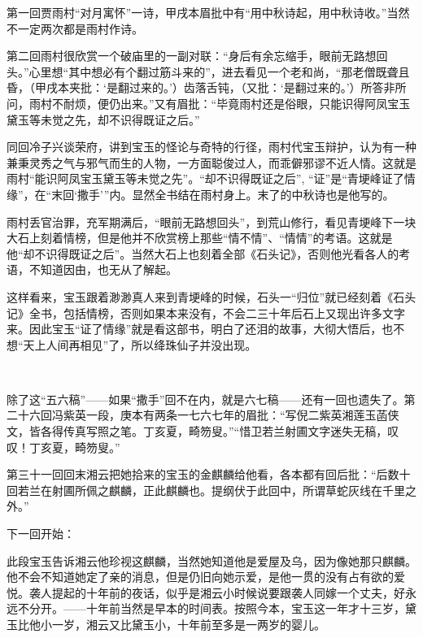 \par 第一回贾雨村“对月寓怀”一诗，甲戌本眉批中有“用中秋诗起，用中秋诗收。”当然不一定两次都是雨村作诗。
\par 第二回雨村很欣赏一个破庙里的一副对联：“身后有余忘缩手，眼前无路想回头。”心里想“其中想必有个翻过筋斗来的”，进去看见一个老和尚，“那老僧既聋且昏，（甲戌本夹批：‘是翻过来的。'）齿落舌钝，（又批：‘是翻过来的。'）所答非所问，雨村不耐烦，便仍出来。”又有眉批：“毕竟雨村还是俗眼，只能识得阿凤宝玉黛玉等未觉之先，却不识得既证之后。”
\par 同回冷子兴谈荣府，讲到宝玉的怪论与奇特的行径，雨村代宝玉辩护，认为有一种兼秉灵秀之气与邪气而生的人物，一方面聪俊过人，而乖僻邪谬不近人情。这就是雨村“能识阿凤宝玉黛玉等未觉之先”。“却不识得既证之后”, “证”是“青埂峰证了情缘”，在“末回‘撒手’”内。显然全书结在雨村身上。末了的中秋诗也是他写的。
\par 雨村丢官治罪，充军期满后，“眼前无路想回头”，到荒山修行，看见青埂峰下一块大石上刻着情榜，但是他并不欣赏榜上那些“情不情”、“情情”的考语。这就是他“却不识得既证之后”。当然大石上也刻着全部《石头记》，否则他光看各人的考语，不知道因由，也无从了解起。
\par 这样看来，宝玉跟着渺渺真人来到青埂峰的时候，石头一“归位”就已经刻着《石头记》全书，包括情榜，否则如果本来没有，不会二三十年后石上又现出许多文字来。因此宝玉“证了情缘”就是看这部书，明白了还泪的故事，大彻大悟后，也不想“天上人间再相见”了，所以绛珠仙子并没出现。
\par  
\par 除了这“五六稿”——如果“撒手”回不在内，就是六七稿——还有一回也遗失了。第二十六回冯紫英一段，庚本有两条一七六七年的眉批：“写倪二紫英湘莲玉菡侠文，皆各得传真写照之笔。丁亥夏，畸笏叟。”“惜卫若兰射圃文字迷失无稿，叹叹！丁亥夏，畸笏叟。”
\par 第三十一回回末湘云把她拾来的宝玉的金麒麟给他看，各本都有回后批：“后数十回若兰在射圃所佩之麒麟，正此麒麟也。提纲伏于此回中，所谓草蛇灰线在千里之外。”
\par 下一回开始：
\par 此段宝玉告诉湘云他珍视这麒麟，当然她知道他是爱屋及乌，因为像她那只麒麟。他不会不知道她定了亲的消息，但是仍旧向她示爱，是他一贯的没有占有欲的爱悦。袭人提起的十年前的夜话，似乎是湘云小时候说要跟袭人同嫁一个丈夫，好永远不分开。——十年前当然是早本的时间表。按照今本，宝玉这一年才十三岁，黛玉比他小一岁，湘云又比黛玉小，十年前至多是一两岁的婴儿。
